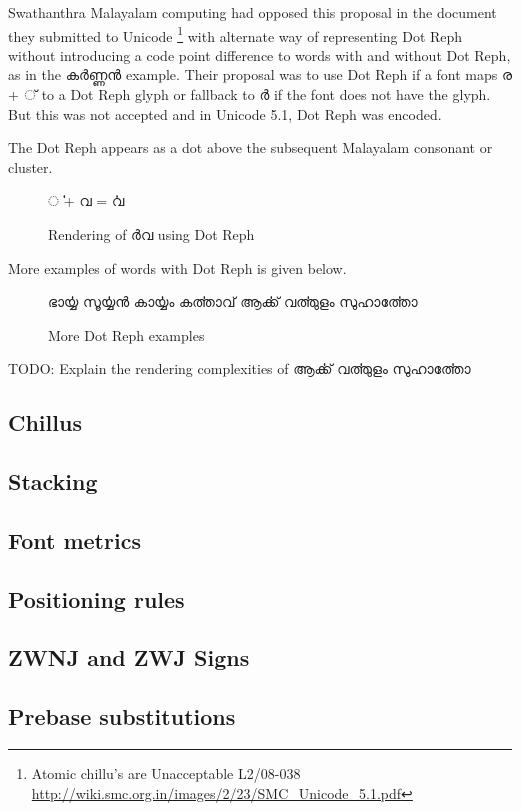 Swathanthra Malayalam computing had opposed this proposal in the document they submitted
to Unicode \footnote{Atomic chillu's are Unacceptable L2/08-038 \url{http://wiki.smc.org.in/images/2/23/SMC_Unicode_5.1.pdf}}
with alternate way of representing Dot Reph without introducing a code point difference
to words with and without Dot Reph, as in the {\malayalam കര്‍ണ്ണന്‍} example. Their proposal was to use Dot Reph if a font maps
{\malayalam ര + ്  } to a Dot Reph glyph or fallback to {\malayalam ര്‍} if the font
does not have the glyph. But this was not accepted and in Unicode 5.1, Dot Reph was encoded.

The Dot Reph appears as a dot above the subsequent Malayalam consonant or cluster.

\begin{figure}[h!]
  \centering
  {\meera\textexample ൎ + വ  = ൎവ }\\
  \caption{Rendering of {\malayalam ര്‍വ } using Dot Reph }
\end{figure}

More examples of words with Dot Reph is given below.

\begin{figure}[h!]
  \centering
  {\meera ഭാൎയ്യ സൂൎയ്യന്‍ കാൎയ്യം  കൎത്താവ്  ആൎക്ക്  വൎത്തുളം  സുഹാൎത്തോ}\\
  \caption{More Dot Reph examples}
\end{figure}

TODO: Explain the rendering complexities of {\meera ആൎക്ക്  വൎത്തുളം  സുഹാൎത്തോ}

\subsection {Chillus}
\subsection {Stacking}
\subsection {Font metrics}
\subsection {Positioning rules}
\subsection {ZWNJ and ZWJ Signs}
\subsection {Prebase substitutions}

